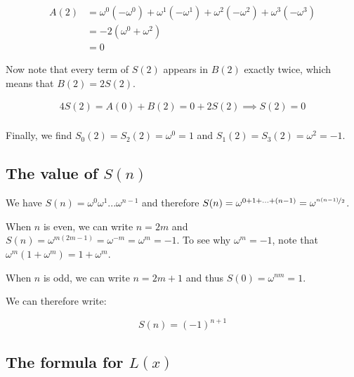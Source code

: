 \documentclass[a4paper]{article}
\begin{document}
\begin{equation}
  \begin{aligned}
    A(2) &= \omega^0(-\omega^0) + \omega^1(-\omega^1) + \omega^2(-\omega^2) + \omega^3(-\omega^3) \\
    &= -2(\omega^0 + \omega^2) \\
    &= 0
  \end{aligned}
\end{equation}

Now note that every term of $S(2)$ appears in $B(2)$ exactly twice, which means that $B(2) = 2S(2)$. 

\begin{equation}
  \begin{aligned}
    4S(2) = A(0) + B(2) = 0 + 2S(2) \implies S(2) = 0\\
  \end{aligned}
\end{equation}

Finally, we find $S_0(2) = S_2(2) = \omega^0 = 1$ and $S_1(2) = S_3(2) = \omega^2 = -1$.  



\subsection{The value of $S(n)$}

We have $S(n) = \omega^0\omega^1...\omega^{n-1}$ and therefore $S(n) = \omega^{0+1+...+(n-1)} = \omega^{\nicefrac{n(n-1)}{2}}$.

When $n$ is even, we can write $n = 2m$ and $S(n) = \omega^{m(2m-1)} = \omega^{-m} = \omega^{m} = -1$. To see why $\omega^{m} = -1$, note that $\omega^{m}(1 + \omega^{m}) = 1 + \omega^{m}$.

When $n$ is odd, we can write $n = 2m + 1$ and thus $S(0) = \omega^{nm} = 1$.

We can therefore write:

\begin{equation}
  S(n) = (-1)^{n+1}
\end{equation}



\subsection{The formula for $L(x)$}
\end{document}
